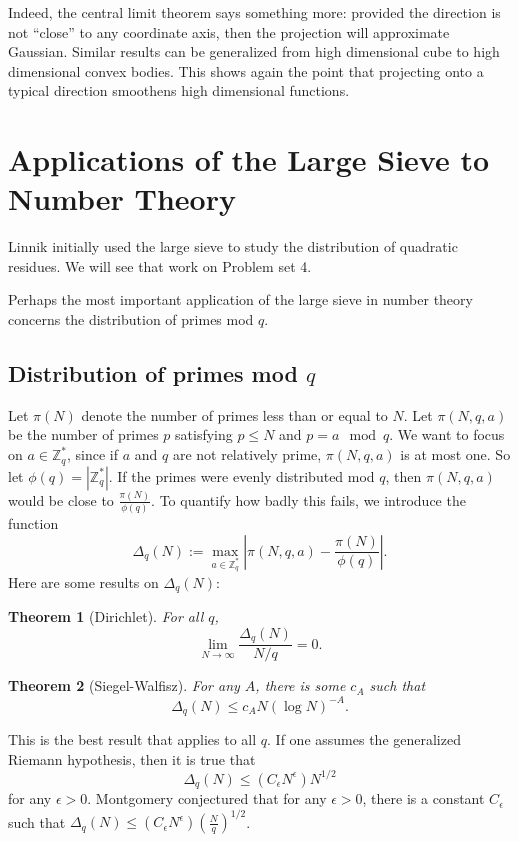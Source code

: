 \documentclass[12pt]{amsart}
\newtheorem{theorem}{Theorem}[section]
\begin{document}
Indeed, the central limit theorem says something more: provided the direction is not ``close'' to any coordinate axis, then the projection will approximate Gaussian. Similar results can be generalized from high dimensional cube to high dimensional convex bodies. This shows again the point that projecting onto a typical direction smoothens high dimensional functions. 




\newpage


\section{Applications of the Large Sieve to Number Theory}

Linnik initially used the large sieve to study the distribution of quadratic residues.   We will see that work on Problem set 4.

Perhaps the most important application of the large sieve in number theory concerns the distribution of primes mod $q$.

\subsection{Distribution of primes mod $q$}

Let $\pi(N)$ denote the number of primes less than or equal to $N$. Let $\pi(N, q, a)$ be the number of primes $p$ satisfying $p \leq N$ and $p = a \mod{q}$. We want to focus on $a \in \mathbb{Z}_q^*$, since if $a$ and $q$ are not relatively prime, $\pi(N, q, a)$ is at most one. So let $\phi(q) = |\mathbb{Z}_q^*|$. If the primes were evenly distributed mod $q$, then $\pi(N, q, a)$ would be close to $\frac{\pi(N)}{\phi(q)}$. To quantify how badly this fails, we introduce the function
\[
    \Delta_q(N) := \max_{a \in \mathbb{Z}_q^*} \left| \pi(N, q, a) - \frac{\pi(N)}{\phi(q)} \right|.
\]
Here are some results on $\Delta_q(N)$:
\begin{theorem}[Dirichlet]
    For all $q$,
    \[
        \lim_{N \to \infty} \frac{\Delta_q(N)}{N/q} = 0.
    \]
\end{theorem}
\begin{theorem}[Siegel-Walfisz]
    For any $A$, there is some $c_A$ such that
    \[
        \Delta_q(N) \leq c_A N (\log N)^{-A}.
    \]
\end{theorem}
This is the best result that applies to all $q$. If one assumes the generalized Riemann hypothesis, then it is true that
\[
    \Delta_q(N) \leq (C_\epsilon N^\epsilon) N^{1/2}
\]
for any $\epsilon > 0$. Montgomery conjectured that for any $\epsilon > 0$, there is a constant $C_\epsilon$ such that $\Delta_q(N) \leq (C_\epsilon N^\epsilon) \left( \frac{N}{q} \right)^{1/2}$.
\end{document}
